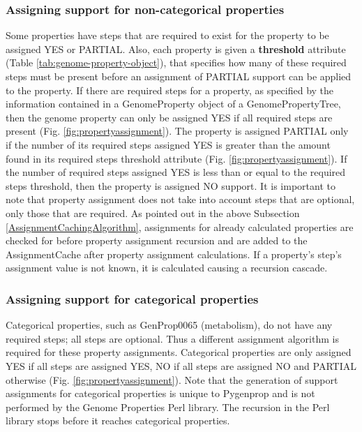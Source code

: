 \subsubsection{Assigning support for non-categorical properties}

Some properties have steps that are required to exist for the property to be assigned YES or PARTIAL. Also, each property is given a \textbf{threshold} attribute (Table \ref{tab:genome-property-object}), that specifies how many of these required steps must be present before an assignment of PARTIAL support can be applied to the property. If there are required steps for a property, as specified by the information contained in a GenomeProperty object of a GenomePropertyTree, then the genome property can only be assigned YES if all required steps are present (Fig. \ref{fig:propertyassignment}). The property is assigned PARTIAL only if the number of its required steps assigned YES is greater than the amount found in its required steps threshold attribute (Fig. \ref{fig:propertyassignment}). If the number of required steps assigned YES is less than or equal to the required steps threshold, then the property is assigned NO support. It is important to note that property assignment does not take into account steps that are optional, only those that are required. As pointed out in the above Subsection \ref{AssignmentCachingAlgorithm}, assignments for already calculated properties are checked for before property assignment recursion and are added to the AssignmentCache after property assignment calculations. If a property's step's assignment value is not known, it is calculated causing a recursion cascade.

\subsubsection{Assigning support for categorical properties}

Categorical properties, such as GenProp0065 (metabolism), do not have any required steps; all steps are optional. Thus a different assignment algorithm is required for these property assignments. Categorical properties are only assigned YES if all steps are assigned YES, NO if all steps are assigned NO and PARTIAL otherwise (Fig. \ref{fig:propertyassignment}). Note that the generation of support assignments for categorical properties is unique to Pygenprop and is not performed by the Genome Properties Perl library. The recursion in the Perl library stops before it reaches categorical properties.

